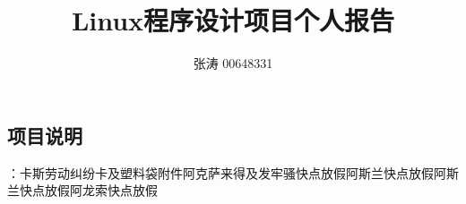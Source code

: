 \documentclass[a4paper,12pt]{article}
\begin{document}
\begin{CJK*}{UTF8}{song}

	\title{{\Large{Linux程序设计项目个人报告}}}
	\author{张涛 00648331}
	\date{}
	\maketitle

	\section{项目说明}
	：卡斯劳动纠纷卡及塑料袋附件阿克萨来得及发牢骚快点放假阿斯兰快点放假阿斯兰快点放假阿龙索快点放假

\end{CJK*}
\end{document}
